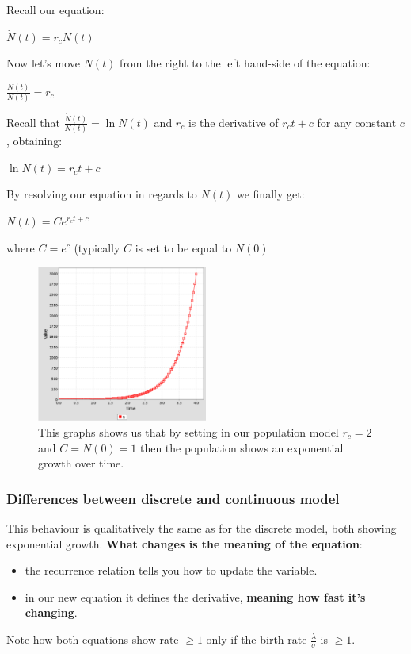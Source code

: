 \par Recall our equation:
\begin{center}
    $\dot{N}(t) = r_{c}N(t)$
\end{center}
Now let's move $N(t)$ from the right to the left hand-side of the equation:

\begin{center}
    $\frac{\dot{N}(t)}{N(t)} = r_{c}$
\end{center}
Recall that $\frac{\dot{N}(t)}{N(t)} = \ln{N(t)}$ and $r_{c}$ is the derivative of $r_{c}t + c$ for any constant $c$, obtaining:

\begin{center}
    $\ln{N(t)} = r_{c}t + c$
\end{center}
By resolving our equation in regards to $N(t)$ we finally get:
\begin{center}
    ${N(t)} = Ce^{r_{c}t + c}$
\end{center}
where $C = e^{c}$ (typically $C$ is set to be equal to $N(0)$

\begin{figure}[h]
    \centering
    \includegraphics[width=0.5\textwidth]{Images/03 - Contiguous Dynamicsl System/linear_birth_model_continuous.png}
    \caption{This graphs shows us that by setting in our population model $r_{c} = 2$ and $C = N(0) = 1$ then the population shows an exponential growth over time.} 
\end{figure}

\subsubsection{Differences between discrete and continuous model}
This behaviour is qualitatively the same as for the discrete model, both showing exponential growth.
\textbf{What changes is the meaning of the equation}: 
\begin{itemize}
    \item the recurrence relation tells you how to update the variable.

    \item in our new equation it defines the derivative, \textbf{meaning how fast it's changing}.
\end{itemize}
Note how both equations show rate $\geq 1$ only if the birth rate $\frac{\lambda}{\sigma}$ is $\geq 1$.

